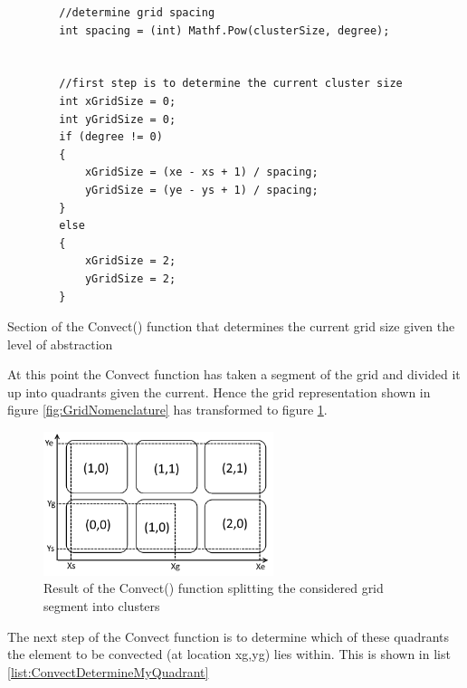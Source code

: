 \begin{listing}[H]
\begin{verbatim}
        //determine grid spacing 
        int spacing = (int) Mathf.Pow(clusterSize, degree);


        //first step is to determine the current cluster size
        int xGridSize = 0;
        int yGridSize = 0;
        if (degree != 0)
        {
            xGridSize = (xe - xs + 1) / spacing;
            yGridSize = (ye - ys + 1) / spacing;
        }
        else
        {
            xGridSize = 2;
            yGridSize = 2;
        }
\end{verbatim}
\caption{Section of the Convect() function that determines the current grid size given the level of abstraction}
\label{list:ConvectGridSize}
\end{listing}

At this point the Convect function has taken a segment of the grid and divided it up into quadrants given the current. Hence the grid representation shown in figure \ref{fig:GridNomenclature} has transformed to figure \ref{fig:GridNomenclature2}.

\begin{figure}[H]
\centering
\includegraphics[width=0.6\textwidth]{Figures/AbstractionGridExample2.png}
\caption{\label{fig:GridNomenclature2} Result of the Convect() function splitting the considered grid segment into clusters}
\end{figure} 

The next step of the Convect function is to determine which of these quadrants the element to be convected (at location xg,yg) lies within. This is shown in list \ref{list:ConvectDetermineMyQuadrant}


